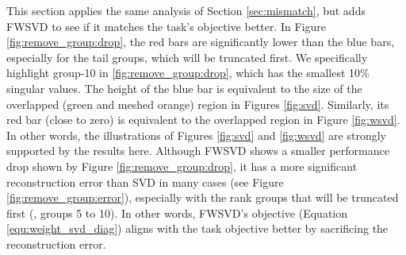This section applies the same analysis of Section \ref{sec:mismatch}, but adds FWSVD to see if it matches the task's objective better. In Figure \ref{fig:remove_group:drop}, the red bars are significantly lower than the blue bars, especially for the tail groups, which will be truncated first.
We specifically highlight group-10 in \ref{fig:remove_group:drop}, which has the smallest 10\% singular values. The height of the blue bar is equivalent to the size of the overlapped (green and meshed orange) region in Figures \ref{fig:svd}. Similarly, its red bar (close to zero) is equivalent to the overlapped region in Figure \ref{fig:wsvd}. In other words, the illustrations of Figures \ref{fig:svd} and \ref{fig:wsvd} are strongly supported by the results here. Although FWSVD shows a smaller performance drop shown by Figure \ref{fig:remove_group:drop}, it has a more significant reconstruction error than SVD in many cases (see Figure \ref{fig:remove_group:error}), especially with the rank groups that will be truncated first (\eg, groups 5 to 10). In other words, FWSVD's objective (Equation \ref{equ:weight_svd_diag}) aligns with the task objective better by sacrificing the reconstruction error.





